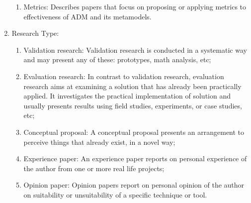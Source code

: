 \begin{enumerate}
\begin{enumerate}
\item Metrics: Describes papers that focus on proposing or applying metrics to effectiveness of ADM and its metamodels.

\end{enumerate}

\item Research Type:

\begin{enumerate}

\item Validation research: Validation research is conducted in a systematic way and may present any of these: prototypes, math analysis, etc;

\item Evaluation research: In contrast to validation research, evaluation research aims at examining a solution that has already been practically applied. It investigates the practical implementation of solution and usually presents results using field studies, experiments, or case studies, etc;

\item Conceptual proposal: A conceptual proposal presents an arrangement to perceive things that already exist, in a novel way;

\item Experience paper: An experience paper reports on personal experience of the author from one or more real life projects;

\item Opinion paper:  Opinion papers report on personal opinion of the author on suitability or unsuitability of a specific technique or tool.

\end{enumerate}

\end{enumerate}